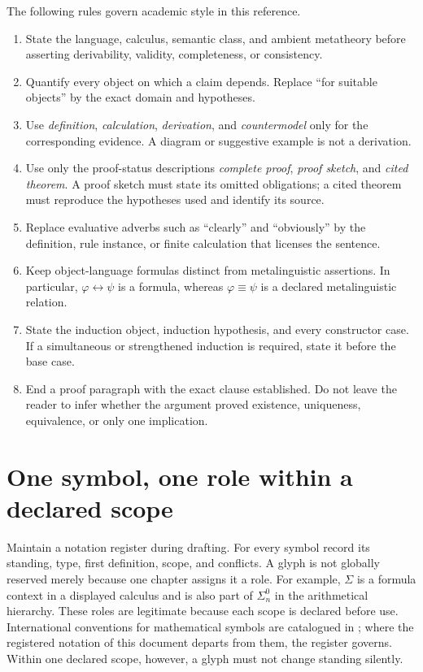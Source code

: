 \documentclass[11pt,oneside,openany]{book}
\theoremstyle{definition}
\theoremstyle{plain}
\theoremstyle{remark}
\begin{document}
The following rules govern academic style in this reference.
\begin{enumerate}
  \item State the language, calculus, semantic class, and ambient metatheory
        before asserting derivability, validity, completeness, or consistency.
  \item Quantify every object on which a claim depends.  Replace ``for suitable
        objects'' by the exact domain and hypotheses.
  \item Use \emph{definition}, \emph{calculation}, \emph{derivation}, and
        \emph{countermodel} only for the corresponding evidence.  A diagram or
        suggestive example is not a derivation.
  \item Use only the proof-status descriptions \emph{complete proof},
        \emph{proof sketch}, and \emph{cited theorem}.  A proof sketch must
        state its omitted obligations; a cited theorem must reproduce the
        hypotheses used and identify its source.
  \item Replace evaluative adverbs such as ``clearly'' and ``obviously'' by the
        definition, rule instance, or finite calculation that licenses the
        sentence.
  \item Keep object-language formulas distinct from metalinguistic assertions.
        In particular, \(\varphi\leftrightarrow\psi\) is a formula, whereas
        \(\varphi\equiv\psi\) is a declared metalinguistic relation.
  \item State the induction object, induction hypothesis, and every constructor
        case.  If a simultaneous or strengthened induction is required, state
        it before the base case.
  \item End a proof paragraph with the exact clause established.  Do not leave
        the reader to infer whether the argument proved existence, uniqueness,
        equivalence, or only one implication.
\end{enumerate}

\section{One symbol, one role within a declared scope}
\label{sec:latex-style-02}

Maintain a notation register during drafting.  For every symbol record its
standing, type, first definition, scope, and conflicts.  A glyph is not globally
reserved merely because one chapter assigns it a role.  For example,
\(\Sigma\) is a formula context in a displayed calculus and is also part of
\(\Sigma^0_n\) in the arithmetical hierarchy.  These roles are legitimate
because each scope is declared before use.  International conventions for
mathematical symbols are catalogued in \cite{ISO80000}; where the
registered notation of this document departs from them, the register
governs.
Within one declared scope, however, a glyph must not change standing silently.
\end{document}

